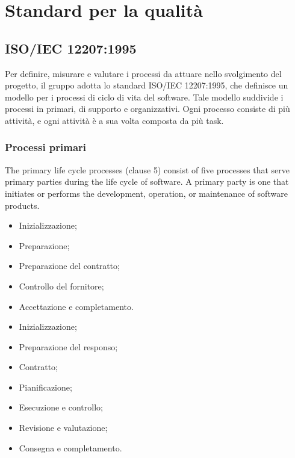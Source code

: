 \section{Standard per la qualità}

\subsection{ISO/IEC 12207:1995}
Per definire, misurare e valutare i processi da attuare nello svolgimento
del progetto, il gruppo adotta lo standard ISO/IEC 12207:1995, che
definisce un modello per i processi di ciclo di vita del software. 
Tale modello suddivide i processi in primari, di supporto e organizzativi.
Ogni processo consiste di più attività, e ogni attività è a sua volta
composta da più task.

\subsubsection{Processi primari}
The primary life cycle processes (clause 5) consist of five processes that serve primary parties during
the life cycle of software. A primary party is one that initiates or performs the development, operation,
or maintenance of software products. 

\begin{itemize}
    \item Inizializzazione;
    \item Preparazione;
    \item Preparazione del contratto;
    \item Controllo del fornitore;
    \item Accettazione e completamento.
\end{itemize}

\begin{itemize}
    \item Inizializzazione;
    \item Preparazione del responso;
    \item Contratto;
    \item Pianificazione;
    \item Esecuzione e controllo;
    \item Revisione e valutazione;
    \item Consegna e completamento.
\end{itemize}

